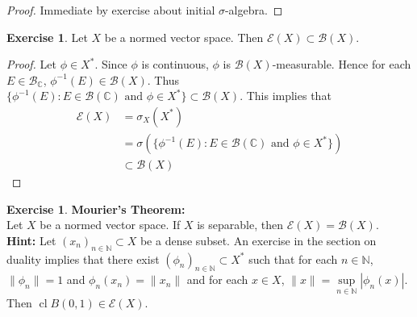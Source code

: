 \documentclass[12pt]{amsart}
\theoremstyle{definition}
\newtheorem{ex}[definition]{Exercise}
\newcommand{\sig}{\sigma}
\newcommand{\C}{\mathbb{C}}
\newcommand{\N}{\mathbb{N}}
\newcommand{\MB}{\mathcal{B}}
\newcommand{\ME}{\mathcal{E}}
\DeclareMathOperator{\cl}{cl}
\begin{document}
	\begin{proof}
		Immediate by exercise about initial $\sig$-algebra.
	\end{proof}
	
	\begin{ex}
		Let $X$ be a normed vector space. Then $\ME(X) \subset \MB(X)$.
	\end{ex}
	
	\begin{proof}
		Let $\phi \in X^*$. Since $\phi$ is continuous, $\phi$ is $\MB(X)$-measurable. Hence for each $E \in \MB_{\C}$, $\phi^{-1}(E) \in \MB(X)$. Thus $\{ \phi^{-1}(E) : E \in \MB(\C) \text{ and } \phi \in X^* \} \subset \MB(X)$.  This implies that 
		\begin{align*}
			\ME(X) 
			& = \sig_X(X^*) \\
			& = \sig(\{ \phi^{-1}(E):E \in \MB(\C) \text{ and } \phi \in X^* \}) \\
			& \subset \MB(X) 
		\end{align*} 
	\end{proof}
	
	\begin{ex} \textbf{Mourier's Theorem:} \\
		Let $X$ be a normed vector space. If $X$ is separable, then $\ME(X) = \MB(X)$. \\
		\textbf{Hint:} Let $(x_n)_{n \in \N} \subset X$ be a dense subset. An exercise in the section on duality implies that there exist $(\phi_n)_{n \in \N} \subset X^*$ such that for each $n \in \N$, $\|\phi_n\| = 1$ and $\phi_n(x_n) = \|x_n\|$ and for each $x \in X$, $\|x\| = \sup\limits_{n \in \N} |\phi_n(x)|$. Then $ \cl B(0, 1) \in \ME(X)$.  
	\end{ex}
	
\end{document}
